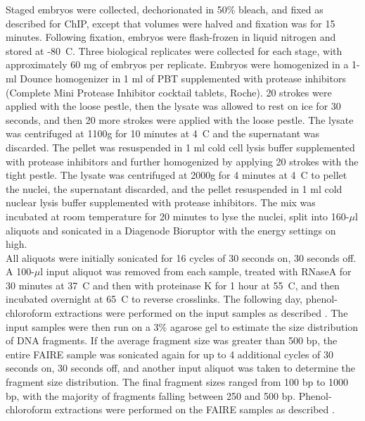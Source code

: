 Staged embryos were collected, dechorionated in 50\% bleach, and fixed as described for ChIP, except that volumes were halved and fixation was for 15 minutes. Following fixation, embryos were flash-frozen in liquid nitrogen and stored at -80\degree~C. Three biological replicates were collected for each stage, with approximately 60 mg of embryos per replicate. Embryos were homogenized in a 1-ml Dounce homogenizer in 1 ml of PBT supplemented with protease inhibitors (Complete Mini Protease Inhibitor cocktail tablets, Roche). 20 strokes were applied with the loose pestle, then the lysate was allowed to rest on ice for 30 seconds, and then 20 more strokes were applied with the loose pestle. The lysate was centrifuged at 1100g for 10 minutes at 4\degree~C and the supernatant was discarded. The pellet was resuspended in 1 ml cold cell lysis buffer supplemented with protease inhibitors and further homogenized by applying 20 strokes with the tight pestle. The lysate was centrifuged at 2000g for 4 minutes at 4\degree~C to pellet the nuclei, the supernatant discarded, and the pellet resuspended in 1 ml cold nuclear lysis buffer supplemented with protease inhibitors. The mix was incubated at room temperature for 20 minutes to lyse the nuclei, split into 160-\(\mu\)l aliquots and sonicated in a Diagenode Bioruptor with the energy settings on high.\\ 

All aliquots were initially sonicated for 16 cycles of 30 seconds on, 30 seconds off. A 100-\(\mu\)l input aliquot was removed from each sample, treated with RNaseA for 30 minutes at 37\degree~C and then with proteinase K for 1 hour at 55\degree~C, and then incubated overnight at 65\degree~C to reverse crosslinks. The following day, phenol-chloroform extractions were performed on the input samples as described \citep{simon_using_2012}. The input samples were then run on a 3\% agarose gel to estimate the size distribution of DNA fragments. If the average fragment size was greater than 500 bp, the entire FAIRE sample was sonicated again for up to 4 additional cycles of 30 seconds on, 30 seconds off, and another input aliquot was taken to determine the fragment size distribution. The final fragment sizes ranged from 100 bp to 1000 bp, with the majority of fragments falling between 250 and 500 bp. Phenol-chloroform extractions were performed on the FAIRE samples as described \citep{simon_using_2012}.

